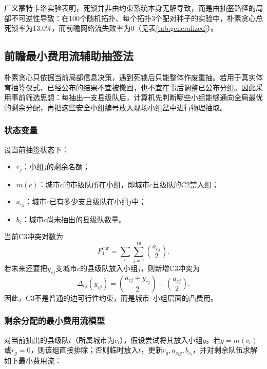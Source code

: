\documentclass[12pt,a4paper]{article}
\begin{document}
广义蒙特卡洛实验表明，死锁并非由约束系统本身无解导致，而是由抽签路径的局部不可逆性导致：在100个随机拓扑、每个拓扑3个配对种子的实验中，朴素贪心总死锁率为13.0\%，而前瞻网络流失败率为0（见表\ref{tab:generalized}）。

\subsection{前瞻最小费用流辅助抽签法}

朴素贪心只依据当前局部信息决策，遇到死锁后只能整体作废重抽。若用于真实体育抽签仪式，已经公布的结果不宜被撤回，也不宜在事后调整已公布分组。因此采用事前筛选思想：每抽出一支县级队后，计算机先判断哪些小组能够通向全局最优的剩余分配，再把这些安全小组编号放入现场小组盆中进行物理抽取。

\subsubsection{状态变量}

设当前抽签状态下：
\begin{itemize}
  \item $r_j$：小组$j$的剩余名额；
  \item $m(c)$：城市$c$的市级队所在小组，即城市$c$县级队的C2禁入组；
  \item $a_{cj}$：城市$c$已有多少支县级队在小组$j$中；
  \item $b_c$：城市$c$尚未抽出的县级队数量。
\end{itemize}

当前C3冲突对数为
\begin{equation}
  F_1^{\mathrm{cur}} = \sum_c\sum_{j=1}^{16}\binom{a_{cj}}{2}.
\end{equation}
若未来还要把$y_{cj}$支城市$c$的县级队放入小组$j$，则新增C3冲突为
\begin{equation}
  \Delta_{cj}(y_{cj})
  =
  \binom{a_{cj}+y_{cj}}{2}-\binom{a_{cj}}{2}.
  \label{eq:q2_delta_c3}
\end{equation}
因此，C3不是普通的边可行性约束，而是城市--小组层面的凸费用。

\subsubsection{剩余分配的最小费用流模型}

对当前抽出的县级队$t$（所属城市为$c_t$），假设尝试将其放入小组$g$。若$g=m(c_t)$或$r_g=0$，则该组直接排除；否则临时放入$t$，更新$r_g,a_{c_tg},b_{c_t}$，并对剩余队伍求解如下最小费用流：
\end{document}
